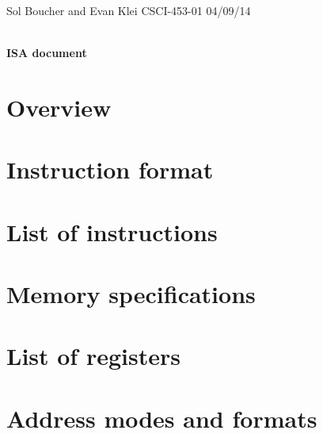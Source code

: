 \documentclass[12pt]{article}
\begin{document}
\begin{framed}
\noindent
Sol Boucher and Evan Klei \hfill CSCI-453-01 \hfill 04/09/14 \\
\vspace{6pt} \\
\centerline{\textbf{\huge ISA document}}
\end{framed}

\section{Overview}

\section{Instruction format}

\section{List of instructions}

\section{Memory specifications}

\section{List of registers}

\section{Address modes and formats}
\end{document}
